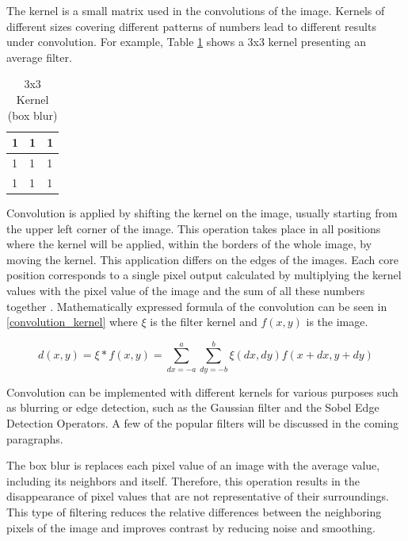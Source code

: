 The kernel is a small matrix used in the convolutions of the image. Kernels of different sizes covering different patterns of numbers lead to different results under convolution. For example, Table \ref{tab:Kernal3_3} shows a 3x3 kernel presenting an average filter.

\begin{table}[htbp]
\begin{center}
\caption{3x3 Kernel (box blur)}
      \begin{tabular}{|l|l|l|}
        \hline
        1 & 1 & 1   \\
        \hline
        1 & 1 & 1   \\
        \hline
        1 & 1 & 1   \\
        \hline
      \end{tabular}
\label{tab:Kernal3_3}
\end{center}
\end{table}

Convolution is applied by shifting the kernel on the image, usually starting from the upper left corner of the image. This operation takes place in all positions where the kernel will be applied, within the borders of the whole image, by moving the kernel. This application differs on the edges of the images. Each core position corresponds to a single pixel output calculated by multiplying the kernel values with the pixel value of the image and the sum of all these numbers together \cite{russ2010image}. Mathematically expressed formula of the convolution can be seen in \ref{convolution_kernel} where  \(\xi\) is the filter kernel and \(f(x,y)\) is the image.

\begin{equation} \label{convolution_kernel}
d(x,y) = \xi * f(x,y) = \sum_{dx=-a}^{a} \sum_{dy=-b}^{b} \xi(dx,dy) f(x + dx, y + dy)
\end{equation}

Convolution can be implemented with different kernels for various purposes such as blurring or edge detection, such as the Gaussian filter and the Sobel Edge Detection Operators. A few of the popular filters will be discussed in the coming paragraphs.

The box blur is replaces each pixel value of an image with the average value, including its neighbors and itself. Therefore, this operation results in the disappearance of pixel values that are not representative of their surroundings. This type of filtering reduces the relative differences between the neighboring pixels of the image and improves contrast by reducing noise and smoothing.

